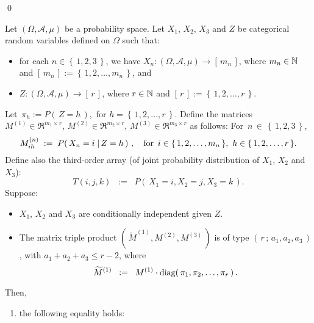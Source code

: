 \qed

\begin{corollary}
\mbox{}\vskip 0.1cm
\noindent
Let $\left(\Omega,\mathcal{A},\mu\right)$ be a probability space.
Let $X_{1}$, $X_{2}$, $X_{3}$ and $Z$ be categorical random variables defined on $\Omega$ such that:
\begin{itemize}
\item
	for each $n \in \left\{\,1, 2, 3\,\right\}$, we have
	$X_{n} : \left(\Omega,\mathcal{A},\mu\right) \longrightarrow \left[\,m_{n}\,\right]$,
	where $m_{n} \in \mathbb{N}$ and $\left[\,m_{n}\,\right] := \left\{\,1,2,\ldots,m_{n}\,\right\}$, and
\item
	$Z : \left(\Omega,\mathcal{A},\mu\right) \longrightarrow \left[\,r\,\right]$,
	where $r \in \mathbb{N}$ and $\left[\,r\,\right] := \left\{\,1,2,\ldots,r\,\right\}$.
\end{itemize}
Let \,$\pi_{h} := P\!\left(\,Z = h\,\right)$, \,for $h = \left\{\,1,2,\ldots,r\,\right\}$.
Define the matrices
$M^{(1)} \in \Re^{m_{1}\times r}$, 
$M^{(2)} \in \Re^{m_{2}\times r}$, 
$M^{(3)} \in \Re^{m_{3}\times r}$
as follows: For \,$n \,\in\, \left\{\,1,2,3\,\right\}$,
\begin{equation*}
M^{(n)}_{ih} \; := \; P\!\left(\,X_{n} = i \;\vert\, Z = h\,\right)\,,
\quad
\textnormal{for \,$i \in \left\{\,1,2,\ldots,m_{n}\,\right\}$, \,$h \in \left\{\,1,2,\ldots,r\,\right\}$}.
\end{equation*}
Define also the third-order array (of joint probability distribution of $X_{1}$, $X_{2}$ and $X_{3}$):
\begin{equation*}
T(i,j,k) \;\; := \;\; P\!\left(\,X_{1} = i, X_{2} = j, X_{3} = k \,\right).
\end{equation*}
Suppose:
\begin{itemize}
\item
	$X_{1}$, $X_{2}$ and $X_{3}$ are conditionally independent given $Z$.
\item
	The matrix triple product
	$\left(\,\widetilde{M}^{(1)},M^{(2)},M^{(3)}\,\right)$ is of type $\left(\,r\,;\,a_{1},a_{2},a_{3}\,\right)$,
	with $a_{1} + a_{2} + a_{3} \leq r - 2$, where
	\begin{equation*}
	\widetilde{M}^{(1)} \;\; := \;\; M^{(1)}\cdot\textnormal{diag}\!\left(\,\pi_{1},\pi_{2},\ldots,\pi_{r}\,\right).
	\end{equation*}
\end{itemize}
Then,
\begin{enumerate}
\item
	the following equality holds:
	\begin{equation*}

\end{equation*}
\end{enumerate}
\end{corollary}
